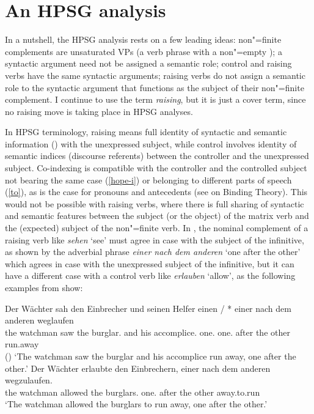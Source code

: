 \section{An HPSG analysis}

In a nutshell, the HPSG analysis rests on a few leading ideas: non"=finite complements are
unsaturated VPs (a verb phrase with a non"=empty \subjl); a syntactic argument need not be assigned
a semantic role; control and raising verbs have the same syntactic arguments; raising verbs do not
assign a semantic role to the syntactic argument that functions as the subject of their non"=finite
complement. 
I continue to use the term \emph{raising}, but it is just a cover term, since no raising move
is taking place in HPSG analyses.

In HPSG terminology, raising means full identity of syntactic and semantic
information () \crossrefchapterp[\pageref{ex:prop22}--\pageref{ex:prop24}]{properties} with the unexpressed subject, while
control involves identity of semantic indices (discourse referents) between the controller and the
unexpressed subject. Co-indexing is compatible with the controller and the controlled subject not
bearing the same case (\ref{hope-i}) or belonging to different parts of speech (\ref{to}), as is the
case for pronouns and antecedents (see  on Binding Theory). This would not be possible
with raising verbs, where there is full sharing of syntactic and semantic features between the
subject (or the object) of the matrix verb and the (expected) subject of the non"=finite verb. In
, the nominal complement of a raising verb like \emph{sehen} `see' must agree in case
with the subject of the infinitive, as shown by the adverbial phrase \emph{einer nach dem anderen} `one after the other' which
agrees in case with the unexpressed subject of the infinitive, but it can have a different case with
a control verb like \emph{erlauben} `allow', as the following examples from  show: 


\eal
\label{german2}
\ex 
\gll Der Wächter  sah den Einbrecher     und seinen Helfer            einen       / *  einer nach dem anderen weglaufen\\
     the watchman saw the burglar.\ACC{} and his    accomplice.\ACC{} one.\ACC{} {} {} one.\NOM{} after the other run.away\\\hfill()
\glt `The watchman saw the burglar and his accomplice run away, one after the other.'
\ex
\gll Der Wächter erlaubte den Einbrechern, einer nach dem anderen wegzulaufen.\\
     the watchman  allowed the burglars.\DAT{} one.\NOM{} after the other away.to.run\\
\glt `The watchman allowed the burglars to run away, one after the other.'
\zl

